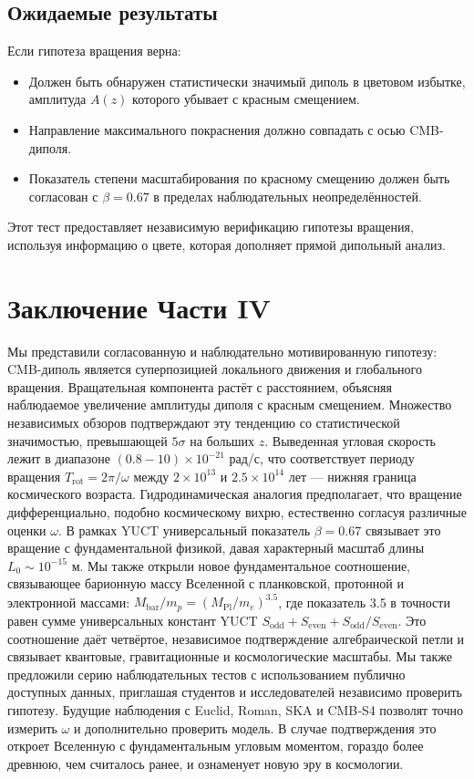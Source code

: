 \documentclass[11pt,a4paper]{article}
\begin{document}
	\subsection{Ожидаемые результаты}
	
	Если гипотеза вращения верна:
	\begin{itemize}
		\item Должен быть обнаружен статистически значимый диполь в цветовом избытке, амплитуда \(A(z)\) которого убывает с красным смещением.
		\item Направление максимального покраснения должно совпадать с осью CMB-диполя.
		\item Показатель степени масштабирования по красному смещению должен быть согласован с \(\beta = 0.67\) в пределах наблюдательных неопределённостей.
	\end{itemize}
	
	Этот тест предоставляет независимую верификацию гипотезы вращения, используя информацию о цвете, которая дополняет прямой дипольный анализ.
	
	\section{Заключение Части IV}
	
	Мы представили согласованную и наблюдательно мотивированную гипотезу: CMB-диполь является суперпозицией локального движения и глобального вращения. Вращательная компонента растёт с расстоянием, объясняя наблюдаемое увеличение амплитуды диполя с красным смещением. Множество независимых обзоров подтверждают эту тенденцию со статистической значимостью, превышающей \(5\sigma\) на больших \(z\). Выведенная угловая скорость лежит в диапазоне \((0.8-10)\times10^{-21}\) рад/с, что соответствует периоду вращения \(T_{\text{rot}} = 2\pi/\omega\) между \(2\times10^{13}\) и \(2.5\times10^{14}\) лет — нижняя граница космического возраста. Гидродинамическая аналогия предполагает, что вращение дифференциально, подобно космическому вихрю, естественно согласуя различные оценки \(\omega\). В рамках YUCT универсальный показатель \(\beta = 0.67\) связывает это вращение с фундаментальной физикой, давая характерный масштаб длины \(L_0 \sim 10^{-15}\) м. Мы также открыли новое фундаментальное соотношение, связывающее барионную массу Вселенной с планковской, протонной и электронной массами: \(M_{\mathrm{bar}}/m_p = (M_{\mathrm{Pl}}/m_e)^{3.5}\), где показатель 3.5 в точности равен сумме универсальных констант YUCT \(S_{\mathrm{odd}} + S_{\mathrm{even}} + S_{\mathrm{odd}}/S_{\mathrm{even}}\). Это соотношение даёт четвёртое, независимое подтверждение алгебраической петли и связывает квантовые, гравитационные и космологические масштабы. Мы также предложили серию наблюдательных тестов с использованием публично доступных данных, приглашая студентов и исследователей независимо проверить гипотезу. Будущие наблюдения с Euclid, Roman, SKA и CMB‑S4 позволят точно измерить \(\omega\) и дополнительно проверить модель. В случае подтверждения это откроет Вселенную с фундаментальным угловым моментом, гораздо более древнюю, чем считалось ранее, и ознаменует новую эру в космологии.
	
\end{document}
